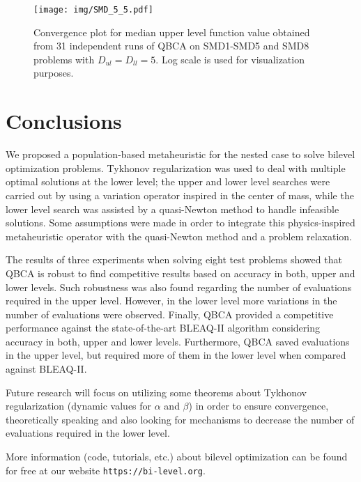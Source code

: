 \documentclass[conference]{IEEEtran}
\theoremstyle{definition}
\begin{document}
\begin{figure*}[t]
    \centering
    \texttt{[image: img/SMD\_5\_5.pdf]}
    \caption{Convergence plot for median upper level function value obtained from 31 independent runs of QBCA on SMD1-SMD5 and SMD8 problems with $D_{ul} = D_{ll} = 5$. Log scale is used for visualization purposes.}
\end{figure*}






\section{Conclusions} %
\label{sec:conclusions}


We proposed a population-based metaheuristic for the nested case to solve bilevel
optimization problems. Tykhonov regularization was used to deal with multiple
optimal solutions at the lower level; the upper and lower level searches were
carried out by using a variation operator inspired in the center of mass, while
the lower level search was assisted by a quasi-Newton method to handle infeasible
solutions. Some assumptions were made in order to integrate this physics-inspired
metaheuristic operator with the quasi-Newton method and a problem relaxation.

The results of three experiments when solving eight test problems showed that QBCA
is robust to find competitive results based on accuracy in both, upper and lower
levels. Such robustness was also found regarding the number of evaluations required
in the upper level. However, in the lower level more variations in the number of
evaluations were observed. Finally, QBCA provided a competitive performance against
the state-of-the-art BLEAQ-II algorithm considering accuracy in both, upper and 
lower levels. Furthermore, QBCA saved evaluations in the upper level, but required
more of them in the lower level when compared against BLEAQ-II. 

Future research will focus on utilizing some theorems about Tykhonov regularization
(dynamic values for $\alpha$ and $\beta$) in order to ensure convergence, theoretically
speaking and also looking for mechanisms to decrease the number of evaluations
required in the lower level.

More information (code, tutorials, etc.) about bilevel optimization can be found
for free at our website \verb|https://bi-level.org|.
\end{document}
